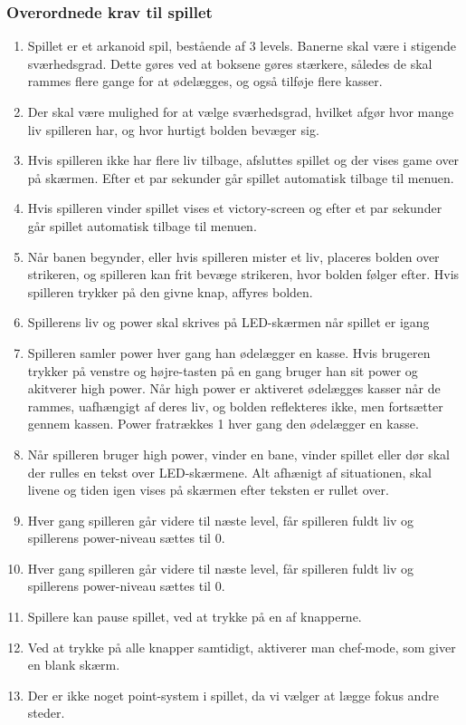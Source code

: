 \subsubsection{Overordnede krav til spillet}
\begin{enumerate}
\item Spillet er et arkanoid spil, bestående af 3 levels. Banerne skal være i stigende sværhedsgrad. Dette gøres ved at boksene gøres stærkere, således de skal rammes flere gange for at ødelægges, og også tilføje flere kasser.
\item Der skal være mulighed for at vælge sværhedsgrad, hvilket afgør hvor mange liv spilleren har, og hvor hurtigt bolden bevæger sig.
\item Hvis spilleren ikke har flere liv tilbage, afsluttes spillet og der vises game over på skærmen. Efter et par sekunder går spillet automatisk tilbage  til menuen.
\item Hvis spilleren vinder spillet vises et victory-screen og efter et par sekunder går spillet automatisk tilbage til menuen.
\item Når banen begynder, eller hvis spilleren mister et liv, placeres bolden over strikeren, og spilleren kan frit bevæge strikeren, hvor bolden følger efter. Hvis spilleren trykker på den givne knap, affyres bolden.
\item Spillerens liv og power skal skrives på LED-skærmen når spillet er igang
\item Spilleren samler power hver gang han ødelægger en kasse. Hvis brugeren trykker på venstre og højre-tasten på en gang bruger han sit power og akitverer high power. Når high power er aktiveret ødelægges kasser når de rammes, uafhængigt af deres liv, og bolden reflekteres ikke, men fortsætter gennem kassen. Power fratrækkes 1 hver gang den ødelægger en kasse.
\item Når spilleren bruger high power, vinder en bane, vinder spillet eller dør skal der rulles en tekst over LED-skærmene. Alt afhænigt af situationen, skal livene og tiden igen vises på skærmen efter teksten er rullet over.
\item Hver gang spilleren går videre til næste level, får spilleren fuldt liv og spillerens power-niveau sættes til 0.
\item Hver gang spilleren går videre til næste level, får spilleren fuldt liv og spillerens power-niveau sættes til 0.
\item Spillere kan pause spillet, ved at trykke på en af knapperne.
\item Ved at trykke på alle knapper samtidigt, aktiverer man chef-mode, som giver en blank skærm.  
\item Der er ikke noget point-system i spillet, da vi vælger at lægge fokus andre steder.
\end{enumerate}
